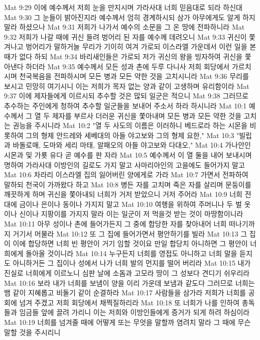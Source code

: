 Mat 9:29  이에 예수께서 저희 눈을 만지시며 가라사대 너희 믿음대로 되라 하신대
Mat 9:30  그 눈들이 밝아진지라 예수께서 엄히 경계하시되 삼가 아무에게도 알게 하지 말라 하셨으나
Mat 9:31  저희가 나가서 예수의 소문을 그 온 땅에 전파하니라
Mat 9:32  저희가 나갈 때에 귀신 들려 벙어리 된 자를 예수께 데려오니
Mat 9:33  귀신이 쫓겨나고 벙어리가 말하거늘 무리가 기이히 여겨 가로되 이스라엘 가운데서 이런 일을 본 때가 없다 하되
Mat 9:34  바리새인들은 가로되 저가 귀신의 왕을 빙자하여 귀신을 쫓아낸다 하더라
Mat 9:35  예수께서 모든 성과 촌에 두루 다니사 저희 회당에서 가르치시며 천국복음을 전파하시며 모든 병과 모든 약한 것을 고치시니라
Mat 9:36  무리를 보시고 민망히 여기시니 이는 저희가 목자 없는 양과 같이 고생하며 유리함이라
Mat 9:37  이에 제자들에게 이르시되 추수할 것은 많되 일군은 적으니
Mat 9:38  그러므로 추수하는 주인에게 청하여 추수할 일군들을 보내어 주소서 하라 하시니라
Mat 10:1  예수께서 그 열 두 제자를 부르사 더러운 귀신을 쫓아내며 모든 병과 모든 약한 것을 고치는 권능을 주시니라
Mat 10:2  "열 두 사도의 이름은 이러하니 베드로라 하는 시몬을 비롯하여 그의 형제 안드레와 세베대의 아들 야고보와 그의 형제 요한,"
Mat 10:3  "빌립과 바돌로매, 도마와 세리 마태, 알패오의 아들 야고보와 다대오,"
Mat 10:4  가나안인 시몬과 및 가룟 유다 곧 예수를 판 자라
Mat 10:5  예수께서 이 열 둘을 내어 보내시며 명하여 가라사대 이방인의 길로도 가지 말고 사마리아인의 고을에도 들어가지 말고
Mat 10:6  차라리 이스라엘 집의 잃어버린 양에게로 가라
Mat 10:7  가면서 전파하여 말하되 천국이 가까왔다 하고
Mat 10:8  병든 자를 고치며 죽은 자를 살리며 문둥이를 깨끗하게 하며 귀신을 쫓아내되 너희가 거저 받았으니 거저 주어라
Mat 10:9  너희 전대에 금이나 은이나 동이나 가지지 말고
Mat 10:10  여행을 위하여 주머니나 두 벌 옷이나 신이나 지팡이를 가지지 말라 이는 일군이 저 먹을것 받는 것이 마땅함이니라
Mat 10:11  아무 성이나 촌에 들어가든지 그 중에 합당한 자를 찾아내어 너희 떠나기까지 거기서 머물라
Mat 10:12  또 그 집에 들어가면서 평안하기를 빌라
Mat 10:13  그 집이 이에 합당하면 너희 빈 평안이 거기 임할 것이요 만일 합당치 아니하면 그 평안이 너희에게 돌아올 것이니라
Mat 10:14  누구든지 너희를 영접도 아니하고 너희 말을 듣지도 아니하거든 그 집이나 성에서 나가 너희 발의 먼지를 떨어 버리라
Mat 10:15  내가 진실로 너희에게 이르노니 심판 날에 소돔과 고모라 땅이 그 성보다 견디기 쉬우리라
Mat 10:16  보라 내가 너희를 보냄이 양을 이리 가운데 보냄과 같도다 그러므로 너희는 뱀 같이 지혜롭고 비둘기 같이 순결하라
Mat 10:17  사람들을 삼가라 저희가 너희를 공회에 넘겨 주겠고 저희 회당에서 채찍질하리라
Mat 10:18  또 너희가 나를 인하여 총독들과 임금들 앞에 끌려 가리니 이는 저희와 이방인들에게 증거가 되게 하려 하심이라
Mat 10:19  너희를 넘겨줄 때에 어떻게 또는 무엇을 말할까 염려치 말라 그 때에 무슨 말할 것을 주시리니
